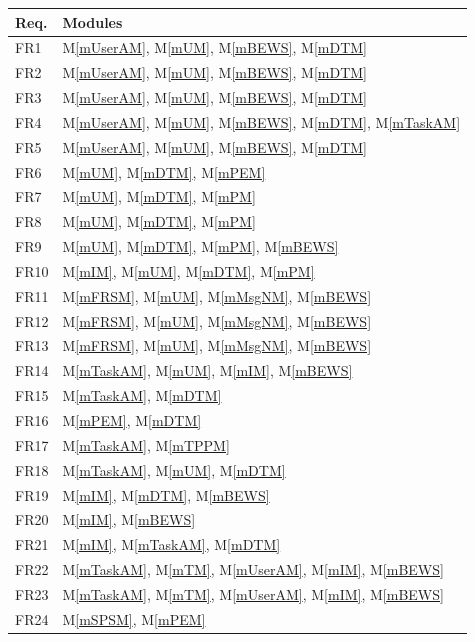\documentclass[12pt, titlepage]{article}
\newcommand{\mref}[1]{M\ref{#1}}
\begin{document}
\begin{table}[H]
\centering
\begin{tabular}{p{} p{}}
\toprule
\textbf{Req.} & \textbf{Modules}\\
\midrule
FR1 & \mref{mUserAM}, \mref{mUM}, \mref{mBEWS}, \mref{mDTM}\\
FR2 & \mref{mUserAM}, \mref{mUM}, \mref{mBEWS}, \mref{mDTM}\\
FR3 & \mref{mUserAM}, \mref{mUM}, \mref{mBEWS}, \mref{mDTM}\\
FR4 & \mref{mUserAM}, \mref{mUM}, \mref{mBEWS}, \mref{mDTM}, \mref{mTaskAM}\\
FR5 & \mref{mUserAM}, \mref{mUM}, \mref{mBEWS}, \mref{mDTM}\\
FR6 & \mref{mUM}, \mref{mDTM}, \mref{mPEM}\\
FR7 & \mref{mUM}, \mref{mDTM}, \mref{mPM}\\
FR8 & \mref{mUM}, \mref{mDTM}, \mref{mPM}\\
FR9 & \mref{mUM}, \mref{mDTM}, \mref{mPM}, \mref{mBEWS}\\
FR10 &  \mref{mIM}, \mref{mUM}, \mref{mDTM}, \mref{mPM}\\
FR11 & \mref{mFRSM}, \mref{mUM}, \mref{mMsgNM}, \mref{mBEWS}\\
FR12 & \mref{mFRSM}, \mref{mUM}, \mref{mMsgNM}, \mref{mBEWS}\\
FR13 & \mref{mFRSM}, \mref{mUM}, \mref{mMsgNM}, \mref{mBEWS}\\
FR14 & \mref{mTaskAM}, \mref{mUM}, \mref{mIM}, \mref{mBEWS}\\
FR15 & \mref{mTaskAM}, \mref{mDTM}\\
FR16 & \mref{mPEM}, \mref{mDTM}\\
FR17 & \mref{mTaskAM}, \mref{mTPPM}\\
FR18 & \mref{mTaskAM}, \mref{mUM}, \mref{mDTM}\\
FR19 & \mref{mIM}, \mref{mDTM}, \mref{mBEWS}\\
FR20 & \mref{mIM}, \mref{mBEWS}\\
FR21 & \mref{mIM}, \mref{mTaskAM}, \mref{mDTM}\\
FR22 & \mref{mTaskAM}, \mref{mTM}, \mref{mUserAM}, \mref{mIM},  \mref{mBEWS}\\
FR23 & \mref{mTaskAM}, \mref{mTM}, \mref{mUserAM}, \mref{mIM},  \mref{mBEWS}\\
FR24 & \mref{mSPSM}, \mref{mPEM}\\

\end{tabular}
\end{table}
\end{document}
